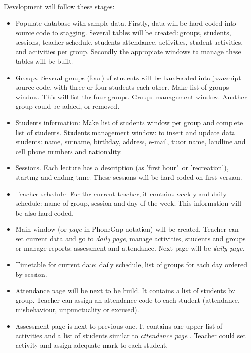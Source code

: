 		
  Development will follow these stages:
	\begin{itemize}
  \item   Populate database with sample data. Firstly, data will be hard-coded into source code to stagging. Several tables will be created:
  groups, students, sessions, teacher schedule, students attendance, activities, student activities, and activities per group. Secondly 
  the appropiate windows to manage these tables will be built.
  
  \item   Groups: Several groups (four) of students will be hard-coded into javascript source code, with three or four students each other.
  \subitem  Make list of groups window. This will list the four groups.
  \subitem  Groups management window. Another group could be added, or removed.
  
  \item  Students information:
  \subitem   Make list of students window per group and complete list of students. 
  \subitem   Students management window: to insert and update data students: name, surname, birthday, address, e-mail,  tutor name,
    landline and cell phone numbers and nationality.
    
  \item  Sessions. Each lecture has a description (as 'first hour', or 'recreation'), starting and ending time.  These sessions will be hard-coded on first version.
  \item  Teacher schedule. For the current teacher, it contains weekly and daily schedule: name of group, session and day of the week. This information will be also hard-coded. 
  \item Main window (or \emph{page} in PhoneGap notation) will be created. Teacher can set current data and go to \textit{daily page}, 
   manage activities, students and groups or manage reports: assessment and attendance. Next page will be \textit{daily page}.
   
  \item Timetable for current date: daily schedule, list of groups for each day ordered by session.
  
  \item Attendance page will be next to be build. It contains a list of students by group. Teacher can assign an attendance code to each student (attendance, misbehaviour, unpunctuality or excused).
  
  \item Assessment page is next to previous one. It contains one upper list of activities and a list of students similar to 
  \emph{attendance page }. Teacher could set activity and assign adequate mark to each student.
     

\end{itemize}
